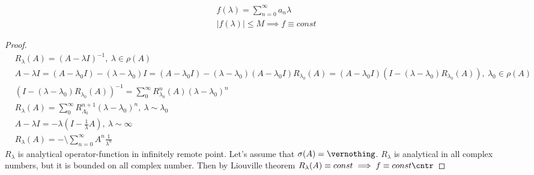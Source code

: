 \begin{thm}[Liouville]
  \begin{align*}
    &f(\lambda) = \sum_{n = 0}^\infty a_n \lambda \\
    &|f(\lambda)| \leq M \implies f \equiv const
  \end{align*}
\end{thm}

\begin{proof}
  \begin{align*}
    &R_\lambda(A) = (A - \lambda I)^{-1},\ \lambda \in \rho(A) \\
    &A - \lambda I = (A - \lambda_0 I) - (\lambda - \lambda_0) I  = (A - \lambda_0 I) - (\lambda - \lambda_0) (A - \lambda_0 I) R_{\lambda_0}(A) = (A - \lambda_0 I)(I - (\lambda - \lambda_0)R_{\lambda_0}(A)),\ \lambda_0 \in \rho(A)\\ 
    &(I - (\lambda - \lambda_0) R_{\lambda_0}(A))^{-1} = \sum_0^\infty R_{\lambda_0}^n(A)(\lambda - \lambda_0)^n \\
    &R_\lambda(A) = \sum_0^\infty R_{\Lambda_0}^{n + 1} (\lambda - \lambda_0)^n,\ \lambda \sim \lambda_0 \\
    &A - \lambda I = -\lambda(I - \frac 1\lambda A),\ \lambda \sim \infty \\
    &R_\lambda(A) = -\setminus \sum_{n = 0}^\infty A^n \frac{1}{\lambda^n}
  \end{align*}
  $R_\lambda$ is analytical operator-function in infinitely remote point.
  Let's assume that $\sigma(A) = \vernothing$. 
  $R_\lambda$ is analytical in all complex numbers, but it is bounded on all
  complex number. Then by Liouville theorem $R_\lambda(A) \equiv const \implies
  f \equiv const \cntr$
\end{proof}
